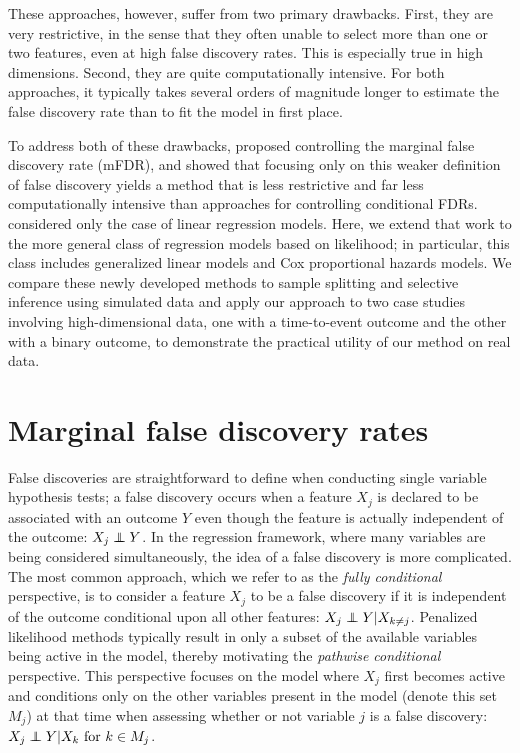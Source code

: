 These approaches, however, suffer from two primary drawbacks.  First, they are very restrictive, in the sense that they often unable to select more than one or two features, even at high false discovery rates.  This is especially true in high dimensions.  Second, they are quite computationally intensive.  For both approaches, it typically takes several orders of magnitude longer to estimate the false discovery rate than to fit the model in first place.

To address both of these drawbacks, \citet{BrehenyMFDR} proposed controlling the marginal false discovery rate (mFDR), and showed that focusing only on this weaker definition of false discovery yields a method that is less restrictive and far less computationally intensive than approaches for controlling conditional FDRs.  \citet{BrehenyMFDR} considered only the case of linear regression models.  Here, we extend that work to the more general class of regression models based on likelihood; in particular, this class includes generalized linear models and Cox proportional hazards models.  We compare these newly developed methods to sample splitting and selective inference using simulated data and apply our approach to two case studies involving high-dimensional data, one with a time-to-event outcome and the other with a binary outcome, to demonstrate the practical utility of our method on real data.

\section{Marginal false discovery rates}

False discoveries are straightforward to define when conducting single variable hypothesis tests; a false discovery occurs when a feature $X_j$ is declared to be associated with an outcome $Y$ even though the feature is actually independent of the outcome: $X_j \independent Y$. In the regression framework, where many variables are being considered simultaneously, the idea of a false discovery is more complicated. The most common approach, which we refer to as the \textit{fully conditional} perspective, is to consider a feature $X_j$ to be a false discovery if it is independent of the outcome conditional upon all other features: $X_j \independent Y | X_{k \neq j}$. Penalized likelihood methods typically result in only a subset of the available variables being active in the model, thereby motivating the \textit{pathwise conditional} perspective.  This perspective focuses on the model where $X_j$ first becomes active and conditions only on the other variables present in the model (denote this set $M_j$) at that time when assessing whether or not variable $j$ is a false discovery: $X_j \independent Y | X_k \text{ for } k \in M_j$.

